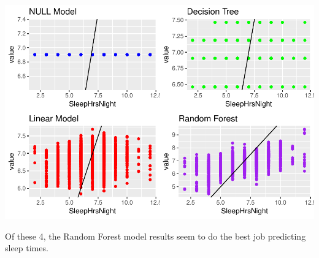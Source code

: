 \documentclass[]{article}
\begin{document}
\includegraphics{Hmwk7AnswerKey_files/figure-latex/unnamed-chunk-29-1.pdf}

Of these 4, the Random Forest model results seem to do the best job
predicting sleep times.
\end{document}
